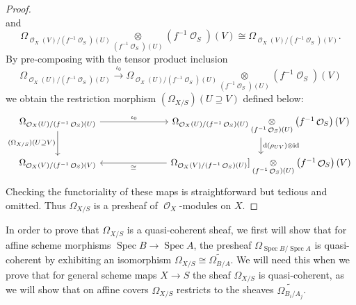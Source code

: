 \documentclass{amsart}
\theoremstyle{definition}
\DeclareMathOperator{\Ocal}{\mathcal{O}}
\DeclareMathOperator{\id}{id}
\DeclareMathOperator{\Spec}{Spec}
\newcommand{\Kah}[2]{\Omega_{{#1}/{#2}}}
\numberwithin{equation}{subsection}
\begin{document}
\begin{proof}
\[\]
and
\[
\Kah{\Ocal_X(V)}{(f^{-1}\Ocal_S)(U)} \underset{(f^{-1}\Ocal_S)(U)}{\otimes} \left(f^{-1}\Ocal_S\right)(V) \cong \Kah{\Ocal_X(V)}{(f^{-1}\Ocal_S)(V)}.
\]
By pre-composing with the tensor product inclusion
\[
\Kah{\Ocal_X(U)}{(f^{-1}\Ocal_S)(U)} \xrightarrow{\iota_0} \Kah{\Ocal_X(U)}{(f^{-1}\Ocal_S)(U)} \underset{{(f^{-1}\Ocal_S)(U)}}{\otimes} \left(f^{-1}\Ocal_S\right)(V)
\]
we obtain the restriction morphism $(\Kah{X}{S})(U \supseteq V)$ defined below:
\[
\begin{tikzcd}
\Kah{\Ocal_X(U)}{(f^{-1}\Ocal_S)(U)} \ar[rrr]{}{\iota_0} \ar[d, swap]{}{(\Kah{X}{S})(U \supseteq V)} & & &  \Kah{\Ocal_X(U)}{(f^{-1}\Ocal_S)(U)} \underset{{(f^{-1}\Ocal_S)(U)}}{\otimes} \left(f^{-1}\Ocal_S\right)(V) \ar[d]{}{\mathrm{d}(\rho_{UV}) \otimes \id} \\
\Kah{\Ocal_X(V)}{(f^{-1}\Ocal_S)(V)} & & & \Kah{\Ocal_X(V)}{(f^{-1}\Ocal_S)(U)} ]\underset{(f^{-1}\Ocal_S)(U)}{\otimes} \left(f^{-1}\Ocal_S\right)(V) \ar[lll]{}{\cong}
\end{tikzcd}
\]
Checking the functoriality of these maps is straightforward but tedious and omitted. Thus $\Kah{X}{S}$ is a presheaf of $\Ocal_X$-modules on $X$. 
\end{proof}

In order to prove that $\Kah{X}{S}$ is a quasi-coherent sheaf, we first will show that for affine scheme morphisms $\Spec B \to \Spec A$, the presheaf $\Kah{\Spec B}{\Spec A}$ is quasi-coherent by exhibiting an isomorphism $\Kah{X}{S} \cong \tilde{\Kah{B}{A}}$. We will need this when we prove that for general scheme maps $X \to S$ the sheaf $\Kah{X}{S}$ is quasi-coherent, as we will show that on affine covers $\Kah{X}{S}$ restricts to the sheaves $\tilde{\Kah{B_i}{A_j}}$.
\end{document}

